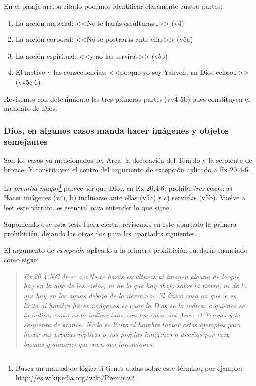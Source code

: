 \documentclass{article}
\begin{document}
\noindent
En el pasaje arriba citado podemos identificar claramente cuatro partes:

\begin{enumerate}
\item La acci\'on material: <<No te har\'as esculturas\ldots>> (v4)
\item La acci\'on corporal: <<No te postrar\'as ante ellas>> (v5a)
\item La acci\'on espiritual: <<y no las servir\'as>> (v5b)
\item El motivo y las consecuencias: <<porque yo soy Yahveh, un Dios celoso\ldots>> (vv5c-6)
\end{enumerate}

\noindent
Revisemos con detenimiento las tres primeras partes (vv4-5b) pues constituyen el mandato de Dios.

\subsubsection{Dios, en algunos casos manda hacer im\'agenes y objetos semejantes}

Son los casos ya mencionados del Arca, la decoraci\'on del Templo y la serpiente de bronce. Y constituyen el centro del argumento de excepci\'on aplicado a Ex 20,4-6.

La \emph{premisa mayor}\footnote{Busca un manual de l\'ogica si tienes dudas sobre este t\'ermino, por ejemplo: http://es.wikipedia.org/wiki/Premisa} parece ser que Dios, en Ex 20,4-6; prohibe \emph{tres} cosas: a) Hacer im\'agenes (v4), b) inclinarse ante ellas (v5a) y c) servirlas (v5b). Vuelve a leer este p\'arrafo, es esencial para entender lo que sigue.

Suponiendo que esta tesis fuera cierta, revisemos en este apartado la primera prohibici\'on, dejando las otras dos para los apartados siguientes.

El argumento de \emph{excepci\'on} aplicado a la primera prohibici\'on quedar\'{i}a enunciado como sigue:

\begin{quote}
\emph{Ex 20,4 NC dice: <<No te har\'as esculturas ni imagen alguna de lo que hay en lo alto de los cielos, ni de lo que hay abajo sobre la tierra, ni de lo que hay en las aguas debajo de la tierra>>. El \'unico caso en que le es l\'{i}cito al hombre hacer im\'agenes es cuando Dios se lo indica, a quienes se lo indica, como se lo indica; tales son los casos del Arca, el Templo y la serpiente de bronce. No le es l\'{i}cito al hombre tomar estos ejemplos para hacer sus propias r\'eplicas o sus propias im\'agenes o dise\~nos por muy buenas y sinceras que sean sus intenciones.}
\end{quote}
\end{document}
